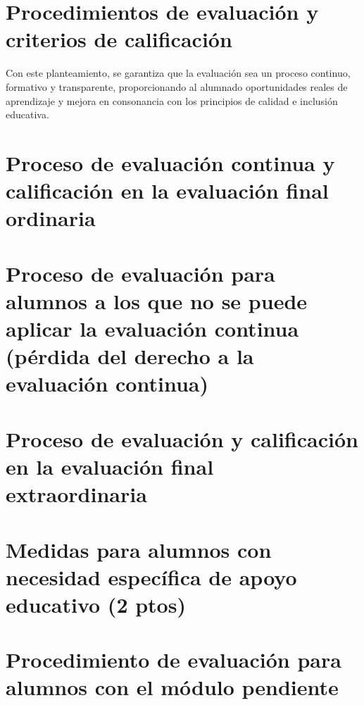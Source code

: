 \section{Procedimientos de evaluación y criterios de calificación}






Con este planteamiento, se garantiza que la evaluación sea un proceso continuo, formativo y transparente, proporcionando al alumnado oportunidades reales de aprendizaje y mejora en consonancia con los principios de calidad e inclusión educativa.


	\section{Proceso de evaluación continua y calificación en la evaluación final ordinaria}

	\section{Proceso de evaluación para alumnos a los que no se puede aplicar la evaluación continua (pérdida del derecho a la evaluación continua)}



	\section{Proceso de evaluación y calificación en la evaluación final extraordinaria}
	\section{Medidas para alumnos con necesidad específica de apoyo educativo (2 ptos)}
	\section{Procedimiento de evaluación para alumnos con el módulo pendiente}

